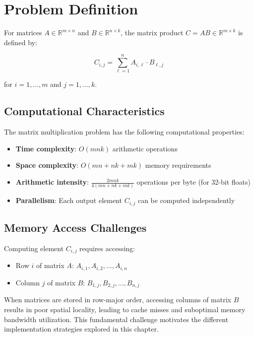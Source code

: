 \documentclass{amsbook}
\theoremstyle{definition}
\begin{document}
\section{Problem Definition}

For matrices $A \in \mathbb{R}^{m \times n}$ and $B \in \mathbb{R}^{n \times k}$, the matrix product $C = AB \in \mathbb{R}^{m \times k}$ is defined by:

\begin{equation}
C_{i,j} = \sum_{\ell=1}^{n} A_{i,\ell} \cdot B_{\ell,j}
\end{equation}

for $i = 1, \ldots, m$ and $j = 1, \ldots, k$.

\subsection{Computational Characteristics}

The matrix multiplication problem has the following computational properties:

\begin{itemize}
\item \textbf{Time complexity}: $O(mnk)$ arithmetic operations
\item \textbf{Space complexity}: $O(mn + nk + mk)$ memory requirements
\item \textbf{Arithmetic intensity}: $\frac{2mnk}{4(mn + nk + mk)}$ operations per byte (for 32-bit floats)
\item \textbf{Parallelism}: Each output element $C_{i,j}$ can be computed independently
\end{itemize}

\subsection{Memory Access Challenges}

Computing element $C_{i,j}$ requires accessing:
\begin{itemize}
\item Row $i$ of matrix $A$: $A_{i,1}, A_{i,2}, \ldots, A_{i,n}$
\item Column $j$ of matrix $B$: $B_{1,j}, B_{2,j}, \ldots, B_{n,j}$
\end{itemize}

When matrices are stored in row-major order, accessing columns of matrix $B$ results in poor spatial locality, leading to cache misses and suboptimal memory bandwidth utilization. This fundamental challenge motivates the different implementation strategies explored in this chapter.
\end{document}

